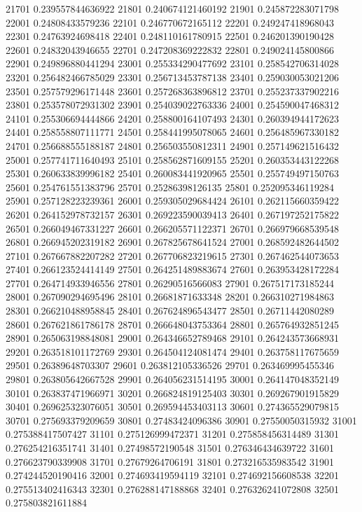 {21701 0.239557844636922
21801 0.240674121460192
21901 0.245872283071798
22001 0.24808433579236
22101 0.246770672165112
22201 0.249247418968043
22301 0.24763924698418
22401 0.248110161780915
22501 0.246201390190428
22601 0.24832043946655
22701 0.247208369222832
22801 0.249024145800866
22901 0.249896880441294
23001 0.255334290477692
23101 0.258542706314028
23201 0.256482466785029
23301 0.256713453787138
23401 0.259030053021206
23501 0.257579296171448
23601 0.257268363896812
23701 0.255237337902216
23801 0.253578072931302
23901 0.254039022763336
24001 0.254590047468312
24101 0.255306694444866
24201 0.258800164107493
24301 0.260394944172623
24401 0.258558807111771
24501 0.258441995078065
24601 0.256485967330182
24701 0.256688555188187
24801 0.256503550812311
24901 0.257149621516432
25001 0.257741711640493
25101 0.258562871609155
25201 0.260353443122268
25301 0.260633839996182
25401 0.260083441920965
25501 0.255749497150763
25601 0.254761551383796
25701 0.25286398126135
25801 0.252095346119284
25901 0.257128223239361
26001 0.259305029684424
26101 0.262115660359422
26201 0.264152978732157
26301 0.269223590039413
26401 0.267197252175822
26501 0.266049467331227
26601 0.266205571122371
26701 0.266979668539548
26801 0.266945202319182
26901 0.267825678641524
27001 0.268592482644502
27101 0.267667882207282
27201 0.267706823219615
27301 0.267462544073653
27401 0.266123524414149
27501 0.264251489883674
27601 0.263953428172284
27701 0.264714933946556
27801 0.26290516566083
27901 0.267517173185244
28001 0.267090294695496
28101 0.26681871633348
28201 0.266310271984863
28301 0.266210488958845
28401 0.267624896543477
28501 0.26711442080289
28601 0.267621861786178
28701 0.266648043753364
28801 0.265764932851245
28901 0.265063198848081
29001 0.264346652789468
29101 0.264243573668931
29201 0.263518101172769
29301 0.264504124081474
29401 0.263758117675659
29501 0.26389648703307
29601 0.263812105336526
29701 0.263469995455346
29801 0.263805642667528
29901 0.264056231514195
30001 0.264147048352149
30101 0.263837471966971
30201 0.266824819125403
30301 0.269267901915829
30401 0.269625323076051
30501 0.269594453403113
30601 0.274365529079815
30701 0.275693379209659
30801 0.27483424096386
30901 0.27550050315932
31001 0.275388417507427
31101 0.275126999472371
31201 0.275858456314489
31301 0.276254216351741
31401 0.27498572190548
31501 0.276346434639722
31601 0.276623790339908
31701 0.27679264706191
31801 0.273216535983542
31901 0.274244520190416
32001 0.274693419594119
32101 0.274692156608538
32201 0.275513402416343
32301 0.276288147188868
32401 0.276326241072808
32501 0.275803821611884
}
